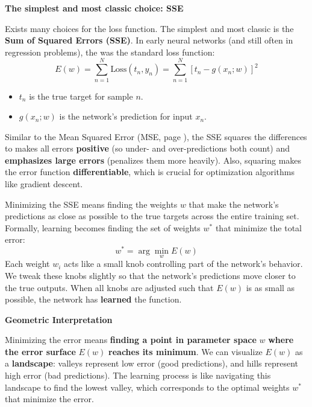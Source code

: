 \begin{flushleft}
    \textcolor{Green3}{ \textbf{The simplest and most classic choice: SSE}}
\end{flushleft}
Exists many choices for the loss function. The simplest and most classic is the \textbf{Sum of Squared Errors (SSE)}. In early neural networks (and still often in regression problems), the  was the standard loss function:
\begin{equation}
    E(w) = \displaystyle\sum_{n=1}^{N} \text{Loss}(t_{n}, y_{n}) = \displaystyle\sum_{n=1}^{N} \left[t_{n} - g\left(x_{n}; w\right)\right]^{2}
\end{equation}
\begin{itemize}
    \item $t_{n}$ is the true target for sample $n$.
    \item $g\left(x_{n}; w\right)$ is the network's prediction for input $x_{n}$.
\end{itemize}
Similar to the Mean Squared Error (MSE, page \pageref{eq:mse}), the SSE squares the differences to makes all errors \textbf{positive} (so under- and over-predictions both count) and \textbf{emphasizes large errors} (penalizes them more heavily). Also, squaring makes the error function \textbf{differentiable}, which is crucial for optimization algorithms like gradient descent.

\highspace
Minimizing the SSE means finding the weights $w$ that make the network's predictions as close as possible to the true targets across the entire training set. Formally, learning becomes finding the set of weights $w^{*}$ that minimize the total error:
\begin{equation*}
    w^{*} = \arg\min_w E(w)
\end{equation*}
Each weight $w_{i}$ acts like a small knob controlling part of the network's behavior. We tweak these knobs slightly so that the network's predictions move closer to the true outputs. When all knobs are adjusted such that $E(w)$ is as small as possible, the network has \textbf{learned} the function.

\highspace
\begin{flushleft}
    \textcolor{Green3}{ \textbf{Geometric Interpretation}}
\end{flushleft}
Minimizing the error means \textbf{finding a point in parameter space} $w$ \textbf{where the error surface} $E(w)$ \textbf{reaches its minimum}. We can visualize $E(w)$ as a \textbf{landscape}: valleys represent low error (good predictions), and hills represent high error (bad predictions). The learning process is like navigating this landscape to find the lowest valley, which corresponds to the optimal weights $w^{*}$ that minimize the error.

